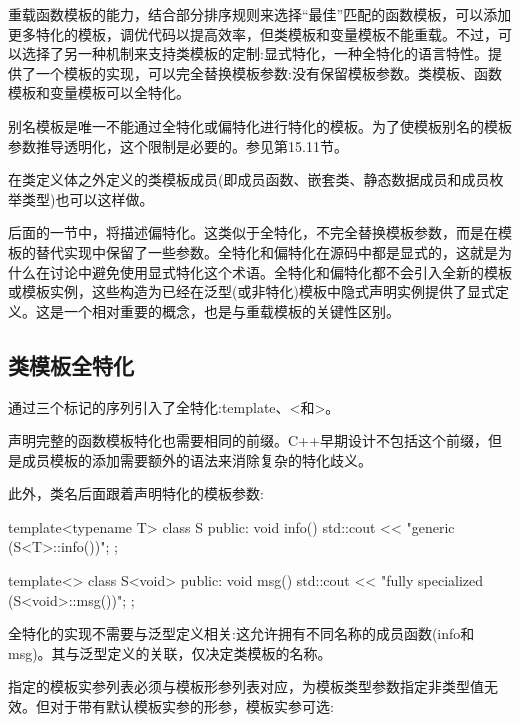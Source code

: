 
重载函数模板的能力，结合部分排序规则来选择“最佳”匹配的函数模板，可以添加更多特化的模板，调优代码以提高效率，但类模板和变量模板不能重载。不过，可以选择了另一种机制来支持类模板的定制:显式特化，一种全特化的语言特性。提供了一个模板的实现，可以完全替换模板参数:没有保留模板参数。类模板、函数模板和变量模板可以全特化。

\begin{notice}别名模板是唯一不能通过全特化或偏特化进行特化的模板。为了使模板别名的模板参数推导透明化，这个限制是必要的。参见第15.11节。
\end{notice}

在类定义体之外定义的类模板成员(即成员函数、嵌套类、静态数据成员和成员枚举类型)也可以这样做。

后面的一节中，将描述偏特化。这类似于全特化，不完全替换模板参数，而是在模板的替代实现中保留了一些参数。全特化和偏特化在源码中都是显式的，这就是为什么在讨论中避免使用显式特化这个术语。全特化和偏特化都不会引入全新的模板或模板实例，这些构造为已经在泛型(或非特化)模板中隐式声明实例提供了显式定义。这是一个相对重要的概念，也是与重载模板的关键性区别。

\subsection{类模板全特化}

通过三个标记的序列引入了全特化:template、<和>。

\begin{notice}声明完整的函数模板特化也需要相同的前缀。C++早期设计不包括这个前缀，但是成员模板的添加需要额外的语法来消除复杂的特化歧义。
\end{notice}

此外，类名后面跟着声明特化的模板参数:

\begin{cpp}
template<typename T>
class S {
	public:
	void info() {
		std::cout << "generic (S<T>::info())\n";
	}
};

template<>
class S<void> {
	public:
	void msg() {
		std::cout << "fully specialized (S<void>::msg())\n";
	}
};
\end{cpp}

全特化的实现不需要与泛型定义相关:这允许拥有不同名称的成员函数(info和msg)。其与泛型定义的关联，仅决定类模板的名称。

指定的模板实参列表必须与模板形参列表对应，为模板类型参数指定非类型值无效。但对于带有默认模板实参的形参，模板实参可选:

